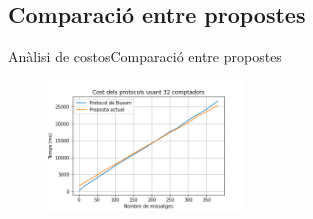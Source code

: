 \documentclass{beamer}
\begin{document}
\subsection{Comparació entre propostes}
\begin{frame}{Anàlisi de costos}{Comparació entre propostes}
	\begin{figure}
		\includegraphics[width=14em]{images/32compt.png}
	\end{figure}
\end{frame}
\end{document}
